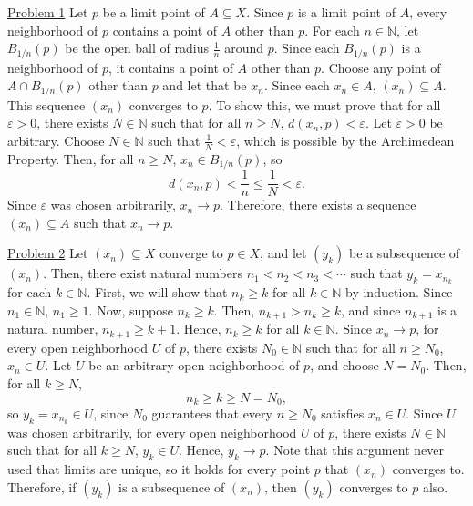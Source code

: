 \documentclass{exam}
\begin{document}
\underline{Problem 1}
\newline
\newline
Let $p$ be a limit point of $A\subseteq X$. Since $p$ is a limit point of $A$, every neighborhood of $p$ contains a point of $A$ other than $p$. For each $n\in\mathbb{N}$, let $B_{1/n}(p)$ be the open ball of radius $\frac{1}{n}$ around $p$. Since each $B_{1/n}(p)$ is a neighborhood of $p$, it contains a point of $A$ other than $p$. Choose any point of $A\cap B_{1/n}(p)$ other than $p$ and let that be $x_n$. Since each $x_n\in A$, $(x_n)\subseteq A$.
\newline
\newline
This sequence $(x_n)$ converges to $p$. To show this, we must prove that for all $\varepsilon>0$, there exists $N\in\mathbb{N}$ such that for all $n\geq N$, $d(x_n,p)<\varepsilon$. Let $\varepsilon>0$ be arbitrary. Choose $N\in\mathbb{N}$ such that $\frac{1}{N}<\varepsilon$, which is possible by the Archimedean Property. Then, for all $n\geq N$, $x_n\in B_{1/n}(p)$, so
\[
    d(x_n,p)<\frac{1}{n}\leq\frac{1}{N}<\varepsilon.
\]
Since $\varepsilon$ was chosen arbitrarily, $x_n\to p$. Therefore, there exists a sequence $(x_n)\subseteq A$ such that $x_n\to p$.
\newline

\underline{Problem 2}
\newline
\newline
Let $(x_n)\subseteq X$ converge to $p\in X$, and let $(y_k)$ be a subsequence of $(x_n)$. Then, there exist natural numbers $n_1<n_2<n_3<\cdots$ such that $y_k=x_{n_k}$ for each $k\in\mathbb{N}$.
\newline
\newline
First, we will show that $n_k\geq k$ for all $k\in\mathbb{N}$ by induction. Since $n_1\in\mathbb{N}$, $n_1\geq 1$. Now, suppose $n_k\geq k$. Then, $n_{k+1}>n_k\geq k$, and since $n_{k+1}$ is a natural number, $n_{k+1}\geq k+1$. Hence, $n_k\geq k$ for all $k\in\mathbb{N}$.
\newline
\newline
Since $x_n\to p$, for every open neighborhood $U$ of $p$, there exists $N_0\in\mathbb{N}$ such that for all $n\geq N_0$, $x_n\in U$. Let $U$ be an arbitrary open neighborhood of $p$, and choose $N=N_0$. Then, for all $k\geq N$,
\[
    n_k\geq k\geq N=N_0,
\]
so $y_k=x_{n_k}\in U$, since $N_0$ guarantees that every $n\geq N_0$ satisfies $x_n\in U$. Since $U$ was chosen arbitrarily, for every open neighborhood $U$ of $p$, there exists $N\in\mathbb{N}$ such that for all $k\geq N$, $y_k\in U$. Hence, $y_k\to p$.
\newline
\newline
Note that this argument never used that limits are unique, so it holds for every point $p$ that $(x_n)$ converges to. Therefore, if $(y_k)$ is a subsequence of $(x_n)$, then $(y_k)$ converges to $p$ also.
\newline
\end{document}
